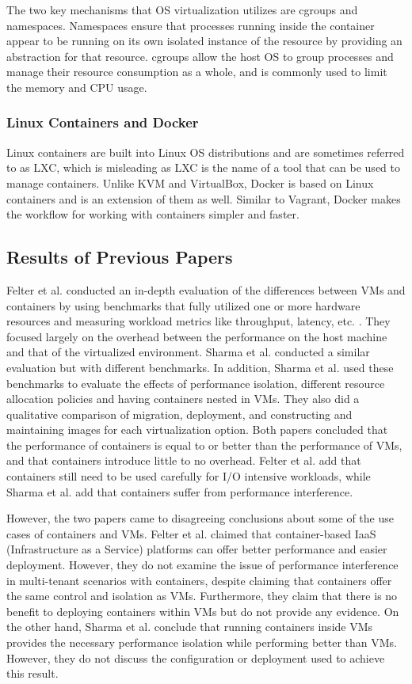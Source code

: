 \documentclass{sig-alternate-10pt}
\begin{document}
The two key mechanisms that OS virtualization utilizes are cgroups and namespaces. Namespaces ensure that processes running inside the container appear to be running on its own isolated instance of the resource by providing an abstraction for that resource. cgroups allow the host OS to group processes and manage their resource consumption as a whole, and is commonly used to limit the memory and CPU usage. 

\subsubsection{Linux Containers and Docker}
Linux containers are built into Linux OS distributions and are sometimes referred to as LXC, which is misleading as LXC is the name of a tool that can be used to manage containers\cite{felter:2014}. Unlike KVM and VirtualBox, Docker is based on Linux containers and is an extension of them as well. Similar to Vagrant, Docker makes the workflow for working with containers simpler and faster.

\subsection{Results of Previous Papers}
Felter et al. conducted an in-depth evaluation of the differences between VMs and containers by using benchmarks that fully utilized one or more hardware resources and measuring workload metrics like throughput, latency, etc. \cite{felter:2014}. They focused largely on the overhead between the performance on the host machine and that of the virtualized environment. Sharma et al. conducted a similar evaluation but with different benchmarks. In addition, Sharma et al. used these benchmarks to evaluate the effects of performance isolation, different resource allocation policies and having containers nested in VMs. They also did a qualitative comparison of migration, deployment, and constructing and maintaining images for each virtualization option. Both papers concluded that the performance of containers is equal to or better than the performance of VMs, and that containers introduce little to no overhead. Felter et al. add that containers still need to be used carefully for I/O intensive workloads, while Sharma et al. add that containers suffer from performance interference. 

However, the two papers came to disagreeing conclusions about some of the use cases of containers and VMs. Felter et al. claimed that container-based IaaS (Infrastructure as a Service) platforms can offer better performance and easier deployment. However, they do not examine the issue of performance interference in multi-tenant scenarios with containers\cite{sharma:2016}, despite claiming that containers offer the same control and isolation as VMs. Furthermore, they claim that there is no benefit to deploying containers within VMs\cite{felter:2014} but do not provide any evidence. On the other hand, Sharma et al. conclude that running containers inside VMs provides the necessary performance isolation while performing better than VMs. However, they do not discuss the configuration or deployment used to achieve this result. 
\end{document}
